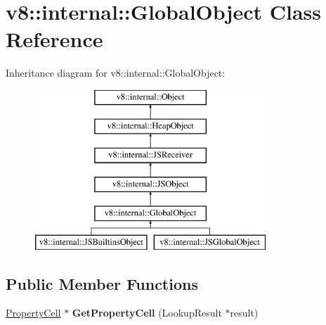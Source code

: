 \hypertarget{classv8_1_1internal_1_1_global_object}{}\section{v8\+:\+:internal\+:\+:Global\+Object Class Reference}
\label{classv8_1_1internal_1_1_global_object}
Inheritance diagram for v8\+:\+:internal\+:\+:Global\+Object\+:\begin{figure}[H]
\begin{center}
\leavevmode
\includegraphics[height=6.000000cm]{classv8_1_1internal_1_1_global_object}
\end{center}
\end{figure}
\subsection*{Public Member Functions}
\begin{DoxyCompactItemize}
\item 
\hypertarget{classv8_1_1internal_1_1_global_object_a2577a67be63427d793c68b87f6775eac}{}\hyperlink{classv8_1_1internal_1_1_property_cell}{Property\+Cell} $\ast$ {\bfseries Get\+Property\+Cell} (Lookup\+Result $\ast$result)\label{classv8_1_1internal_1_1_global_object_a2577a67be63427d793c68b87f6775eac}

\end{DoxyCompactItemize}
